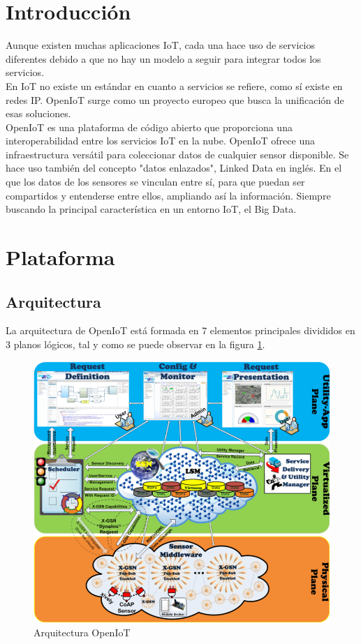 \documentclass[12pt, twoside]{book}
\begin{document}
\section{Introducción}
Aunque existen muchas aplicaciones IoT, cada una hace uso de servicios diferentes debido a que no hay un modelo a seguir para integrar todos los servicios.\\
En IoT no existe un estándar en cuanto a servicios se refiere, como sí existe en redes IP. OpenIoT surge como un proyecto europeo que busca la unificación de esas soluciones. \\
OpenIoT es una plataforma de código abierto que proporciona una interoperabilidad entre los servicios IoT en la nube. 
OpenIoT ofrece una infraestructura versátil para coleccionar datos de cualquier sensor disponible. Se hace uso también del concepto "datos enlazados", Linked Data en inglés. En el que los datos de los sensores se vinculan entre sí, para que puedan ser compartidos y entenderse entre ellos, ampliando así la información. Siempre buscando la principal característica en un entorno IoT, el Big Data. 

\section{Plataforma}
\subsection{Arquitectura}
La arquitectura de OpenIoT está formada en 7 elementos principales divididos en 3 planos lógicos, tal y como se puede observar en la figura \ref{L301}. 
\begin{figure}[H]
\centering
\includegraphics[scale=0.4]{images/openiot_platform1}
\caption{Arquitectura OpenIoT}\label{L301}
\end{figure}
\end{document}
